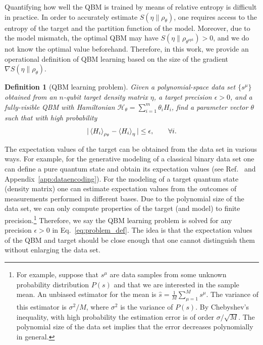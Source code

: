 \documentclass[
    aps,
    prx,
    onecolumn
]{revtex4-2}
\newtheorem{definition}{Definition}
\begin{document}
Quantifying how well the QBM is trained by means of relative entropy is difficult in practice. In order to accurately estimate $S(\eta\|\rho_\theta)$, one requires access to the entropy of the target and the partition function of the model. Moreover, due to the model mismatch, the optimal QBM may have $S(\eta \| \rho_{\theta^{\mathrm{opt}}})>0$, and we do not know the optimal value beforehand. Therefore, in this work, we provide an operational definition of QBM learning based on the size of the gradient $\nabla S(\eta \|\rho_\theta)$.

\begin{definition}[QBM learning problem]
\label{def:problem}
Given a polynomial-space data set $\{s^\mu\}$ obtained from an $n$-qubit target density matrix $\eta$, a target precision $\epsilon>0$, and a fully-visible QBM with Hamiltonian $\mathcal{H}_\theta =\sum_{i=1}^m \theta_i H_i$, find a parameter vector $\theta$ such that with high probability
\begin{equation}
\label{eq:problem_def}
    | \expval{H_i}_{\rho_{\theta}}  - \expval{H_i}_\eta | \leq \epsilon, \qquad \forall i .
\end{equation}
\end{definition}

The expectation values of the target can be obtained from the data set in various ways. For example, for the generative modeling of a classical binary data set one can define a pure quantum state and obtain its expectation values (see Ref.~\cite{Kappen_2020} and Appendix~\ref{app:dataencoding}). For the modeling of a target quantum state (density matrix) one can estimate expectation values from the outcomes of measurements performed in different bases.
Due to the polynomial size of the data set, we can only compute properties of the target (and model) to finite precision.\footnote{For example, suppose that $s^\mu$ are data samples from some unknown probability distribution $P(s)$ and that we are interested in the sample mean. An unbiased estimator for the mean is $\hat{s} = \frac{1}{M}\sum_{\mu=1}^M s^\mu$. The variance of this estimator is $\sigma^2/M$, where $\sigma^2$ is the variance of $P(s)$. By Chebyshev's inequality, with high probability the estimation error is of order $\sigma/\sqrt{M}$. The polynomial size of the data set implies that the error decreases polynomially in general.} Therefore, we say the QBM learning problem is solved for any precision $\epsilon > 0$ in Eq.~\eqref{eq:problem_def}. The idea is that the expectation values of the QBM and target should be close enough that one cannot distinguish them without enlarging the data set.
\end{document}
